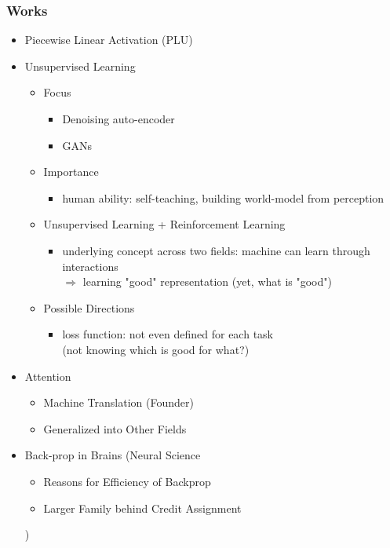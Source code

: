 \subsubsection{Works}
\begin{itemize}
\item Piecewise Linear Activation (PLU)
\item Unsupervised Learning
	\begin{itemize}
	\item Focus
		\begin{itemize}
		\item Denoising auto-encoder
		\item GANs
		\end{itemize}
	\item Importance
		\begin{itemize}
		\item human ability: self-teaching, building world-model from perception
		\end{itemize}
	\item Unsupervised Learning + Reinforcement Learning
		\begin{itemize}
		\item underlying concept across two fields: machine can learn through interactions \\
		$\Rightarrow$ learning "good" representation (yet, what is "good")
		\end{itemize}
	\item Possible Directions
		\begin{itemize}
		\item loss function: not even defined for each task \\ 
		(not knowing which is good for what?)
		\end{itemize}
	\end{itemize}
\item Attention
	\begin{itemize}
	\item Machine Translation (Founder)
	\item Generalized into Other Fields
	\end{itemize}
\item Back-prop in Brains (Neural Science
	\begin{itemize}
	\item Reasons for Efficiency of Backprop
	\item Larger Family behind Credit Assignment
	\end{itemize})
\end{itemize}

